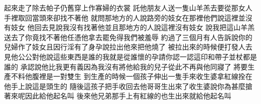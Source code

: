起來走了\chientien 除去帕子\chientien 仍舊穿上作寡婦的衣裳\chuan 
{}託他朋友人\chientien 送一隻山羊羔去\chientien 要從那女人手裡取回當頭來\chientien 卻找不著他\chientien 
{}就問那地方的人說\chientien{}路旁的妓女在那裡\chientien 他們說\chientien 這裡並沒有妓女\chuan 
{}他回去見說\chientien 我沒有找著他\chientien 並且那地方的人說\chientien 這裡沒有妓女\chuan 
{}說\chientien 我把這山羊羔送去了\chientien 你竟找不著他\chientien 任憑他拿去罷\chientien 免得我們被羞辱\chuan\Chuan
{}約過了三個月\chientien 有人告訴說\chientien 你的兒婦作了妓女\chientien 且因行淫有了身孕\yuentien{}說\chientien 拉出他來把他燒了\chuan 
{}被拉出來的時候\chientien 便打發人去見他公公\chientien 對他說\chientien 這些東西是誰的\chientien 我就是從誰懷的孕\chientien 請你認一認\chientien 這印\chientien 和帶子\chientien 並杖\chientien 都是誰的\chuan 
{}承認說\chientien 他比我更有義\chientien 因為我沒有將他給我的兒子\yuentien 從此不再與他同寢了\chuan 
{}將要生產\chientien 不料他腹裡是一對雙生\yuentien 
{}到生產的時候\chientien 一個孩子伸出一隻手來\chientien 收生婆拿紅線拴在他手上\chientien 說\chientien 這是頭生的\chuan 
{}隨後這孩子把手收回去\chientien 他哥哥生出來了\chientien 收生婆說\chientien 你為甚麼搶著來呢\chientien 因此給他起名叫\chuan 
{}後來他兄弟那手上有紅線的\chientien 也生出來\chientien 就給他起名叫\chuan 
